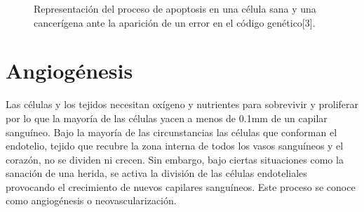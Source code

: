 \begin{figure}[!ht]
\begin{center}
\end{center}\vspace*{-0.6cm}
\caption[Representaci\'on del proceso de apoptosis en una c\'elula sana y una cancer\'igena ante la aparici\'on de un error en el c\'odigo gen\'etico]{Representaci\'on del proceso de apoptosis en una c\'elula sana y una cancer\'igena ante la aparici\'on de un error en el c\'odigo gen\'etico[3].}
\label{fig-apoptosis}
\end{figure}

\section{Angiogénesis}
\hspace{.1cm}Las células y los tejidos necesitan oxígeno y nutrientes para sobrevivir y proliferar por lo que la mayoría de las células yacen a menos de 0.1mm de un capilar sanguíneo. Bajo la mayoría de las circunstancias las células que conforman el endotelio, tejido que recubre la zona interna de todos los vasos sanguíneos y el corazón, no se dividen ni crecen. Sin embargo, bajo ciertas situaciones como la sanación de una herida, se activa la división de las células endoteliales provocando el crecimiento de nuevos capilares sanguíneos. Este proceso se conoce como angiogénesis o neovascularización.

